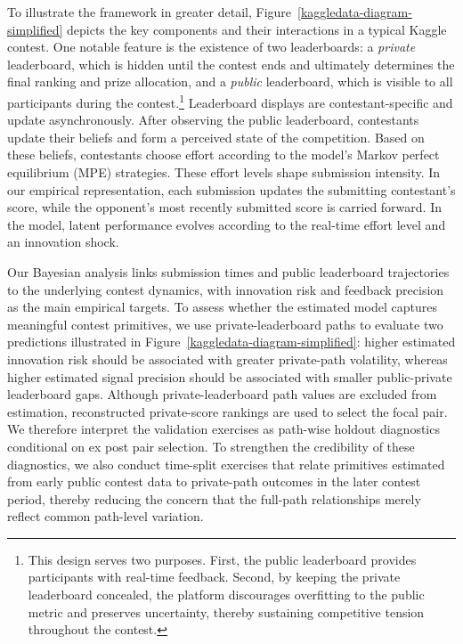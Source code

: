 \documentclass[mnsc]{informs3}
\begin{document}
To illustrate the framework in greater detail, Figure~\ref{kaggledata-diagram-simplified} depicts the key components and their interactions in a typical Kaggle contest.
One notable feature is the existence of two leaderboards: a \textit{private} leaderboard, which is hidden until the contest ends and ultimately determines the final ranking and prize allocation, and a \textit{public} leaderboard, which is visible to all participants during the contest.\footnote{
This design serves two purposes.
First, the public leaderboard provides participants with real-time feedback.
Second, by keeping the private leaderboard concealed, the platform discourages overfitting to the public metric \citep[see also][]{blum2015ladder} and preserves uncertainty, thereby sustaining competitive tension throughout the contest.
}
Leaderboard displays are contestant-specific and update asynchronously.
After observing the public leaderboard, contestants update their beliefs and form a perceived state of the competition.
Based on these beliefs, contestants choose effort according to the model’s Markov perfect equilibrium (MPE) strategies.
These effort levels shape submission intensity. 
In our empirical representation, each submission updates the submitting contestant's score, while the opponent's most recently submitted score is carried forward.
In the model, latent performance evolves according to the real-time effort level and an innovation shock.


Our Bayesian analysis links submission times and public leaderboard trajectories to the underlying contest dynamics, with innovation risk and feedback precision as the main empirical targets.
To assess whether the estimated model captures meaningful contest primitives, we use private-leaderboard paths to evaluate two predictions illustrated in Figure~\ref{kaggledata-diagram-simplified}: 
higher estimated innovation risk should be associated with greater private-path volatility, 
whereas higher estimated signal precision should be associated with smaller public-private leaderboard gaps. 
Although private-leaderboard path values are excluded from estimation, reconstructed private-score rankings are used to select the focal pair. We therefore interpret the validation exercises as path-wise holdout diagnostics conditional on ex post pair selection.
To strengthen the credibility of these diagnostics, we also conduct time-split exercises that relate primitives estimated from early public contest data to private-path outcomes in the later contest period, thereby reducing the concern that the full-path relationships merely reflect common path-level variation.
\end{document}
